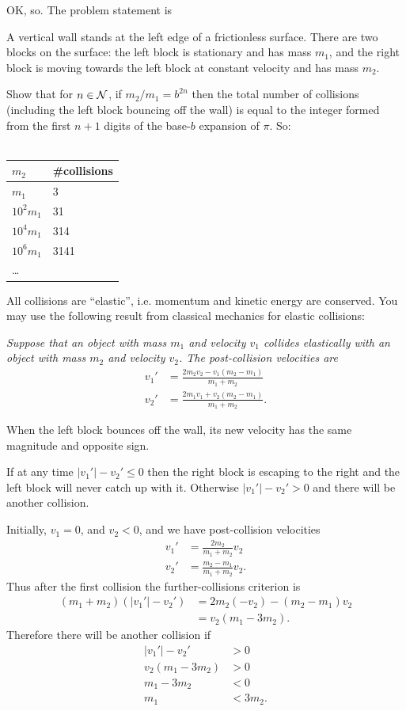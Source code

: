 OK, so. The problem statement is
\begin{mdframed}
  A vertical wall stands at the left edge of a frictionless surface. There are two blocks on the
  surface: the left block is stationary and has mass $m_1$, and the right block is moving towards
  the left block at constant velocity and has mass $m_2$.

  Show that for $n \in \mathcal{N}$, if $m_2/m_1 = b^{2n}$ then the total number of collisions (including the
  left block bouncing off the wall) is equal to the integer formed from the first $n+1$ digits
  of the base-$b$ expansion of $\pi$. So:\\~\\
  \begin{tabular}{l|l}
    $m_2$ & \#collisions \\
    \hline
    $m_1$        & 3 \\
    $10^2m_1$     & 31 \\
    $10^4m_1$   & 314 \\
    $10^6m_1$ & 3141 \\
    \ldots
  \end{tabular}

  All collisions are ``elastic'', i.e. momentum and kinetic energy are conserved. You may use the
  following result from classical mechanics for elastic collisions:

  \textit{Suppose that an object with mass $m_1$ and velocity $v_1$ collides elastically with an
    object with mass $m_2$ and velocity $v_2$. The post-collision velocities are
    \begin{align*}
      v_1' &= \frac{2m_2v_2 - v_1(m_2 - m_1)}{m_1 + m_2} \\
      v_2' &= \frac{2m_1v_1 + v_2(m_2 - m_1)}{m_1 + m_2}.
    \end{align*}
  }

  When the left block bounces off the wall, its new velocity has the same magnitude and opposite
  sign.
\end{mdframed}

If at any time $|v_1'| - v_2' \leq 0$ then the right block is escaping to the right and the left
block will never catch up with it. Otherwise $|v_1'| - v_2' > 0$ and there will be another
collision.

Initially, $v_1 = 0$, and $v_2 < 0$, and we have post-collision velocities
\begin{align*}
  v_1' &= \frac{2m_2}{m_1 + m_2}v_2 \\
  v_2' &= \frac{m_2 - m_1}{m_1 + m_2}v_2.
\end{align*}
Thus after the first collision the further-collisions criterion is
\begin{align*}
  (m_1 + m_2)(|v_1'| - v_2')
  &= 2m_2(-v_2) - (m_2 - m_1)v_2 \\
  &= v_2(m_1 - 3m_2).
\end{align*}
Therefore there will be another collision if
\begin{align*}
  |v_1'| - v_2'   &> 0 \\
  v_2(m_1 - 3m_2) &> 0 \\
  m_1 - 3m_2      &< 0 \\
  m_1             &< 3m_2.
\end{align*}

